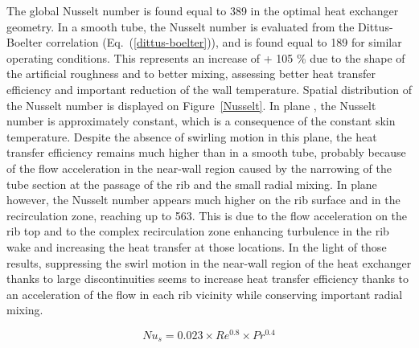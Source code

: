 The global Nusselt number is found equal to 389 in the optimal heat exchanger geometry. In a smooth tube, the Nusselt number is evaluated from the Dittus-Boelter correlation \cite{DittusBoelter1930} (Eq.~(\ref{dittus-boelter})), and is found equal to 189 for similar operating conditions. This represents an increase of + 105 \% due to the shape of the artificial roughness and to better mixing, assessing better heat transfer efficiency and important reduction of the wall temperature. Spatial distribution of the Nusselt number is displayed on Figure~\ref{Nusselt}. In plane , the Nusselt number is approximately constant, which is a consequence of the constant skin temperature. Despite the absence of swirling motion in this plane, the heat transfer efficiency remains much higher than in a smooth tube, probably because of the flow acceleration in the near-wall region caused by the narrowing of the tube section at the passage of the rib and the small radial mixing. In plane  however, the Nusselt number appears much higher on the rib surface and in the recirculation zone, reaching up to 563. This is due to the flow acceleration on the rib top and to the complex recirculation zone enhancing turbulence in the rib wake and increasing the heat transfer at those locations. In the light of those results, suppressing the swirl motion in the near-wall region of the heat exchanger thanks to large discontinuities seems to increase heat transfer efficiency thanks to an acceleration of the flow in each rib vicinity while conserving important radial mixing.

\begin{equation}
Nu_s = 0.023 \times Re^{0.8} \times Pr^{0.4}
\label{dittus-boelter}
\end{equation}

